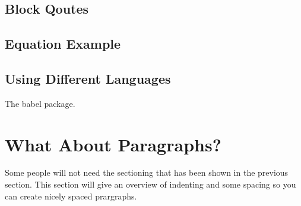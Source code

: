 \documentclass[./dissertation.tex]{subfiles}
\begin{document}
      \subsection{Block Qoutes}


      \subsection{Equation Example}


      \subsection{Using Different Languages}
      The babel package.

      \section{What About Paragraphs?}
      Some people will not need the sectioning that has been shown in the previous section. This section will give an overview of indenting and some spacing so you can create nicely spaced prargraphs.
\end{document}
